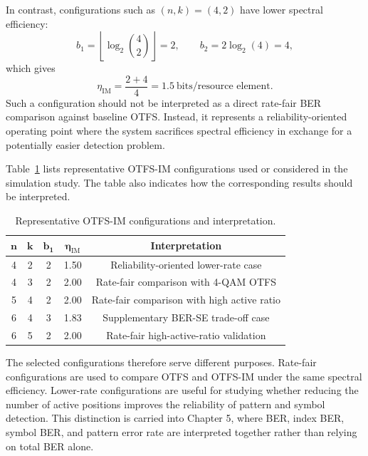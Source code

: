 In contrast, configurations such as \((n,k)=(4,2)\) have lower spectral efficiency:
\begin{equation}
    b_1 = \left\lfloor \log_2 \binom{4}{2} \right\rfloor = 2,
    \qquad
    b_2 = 2\log_2(4)=4,
\end{equation}
which gives
\begin{equation}
    \eta_{\mathrm{IM}} = \frac{2+4}{4}=1.5
    \ \text{bits/resource element}.
\end{equation}
Such a configuration should not be interpreted as a direct rate-fair BER comparison against baseline OTFS. Instead, it represents a reliability-oriented operating point where the system sacrifices spectral efficiency in exchange for a potentially easier detection problem.

Table~\ref{tab:otfs_im_config_examples} lists representative OTFS-IM configurations used or considered in the simulation study. The table also indicates how the corresponding results should be interpreted.

\begin{table}[H]
\centering
\caption{Representative OTFS-IM configurations and interpretation.}
\label{tab:otfs_im_config_examples}
\begin{tabular}{|c|c|c|c|c|}
\hline
\(\boldsymbol{n}\) & \(\boldsymbol{k}\) & \(\boldsymbol{b_1}\) & \(\boldsymbol{\eta_{\mathrm{IM}}}\) & \textbf{Interpretation} \\
\hline
4 & 2 & 2 & 1.50 & Reliability-oriented lower-rate case \\
\hline
4 & 3 & 2 & 2.00 & Rate-fair comparison with 4-QAM OTFS \\
\hline
5 & 4 & 2 & 2.00 & Rate-fair comparison with high active ratio \\
\hline
6 & 4 & 3 & 1.83 & Supplementary BER-SE trade-off case \\
\hline
6 & 5 & 2 & 2.00 & Rate-fair high-active-ratio validation \\
\hline
\end{tabular}
\end{table}

The selected configurations therefore serve different purposes. Rate-fair configurations are used to compare OTFS and OTFS-IM under the same spectral efficiency. Lower-rate configurations are useful for studying whether reducing the number of active positions improves the reliability of pattern and symbol detection. This distinction is carried into Chapter 5, where BER, index BER, symbol BER, and pattern error rate are interpreted together rather than relying on total BER alone.
